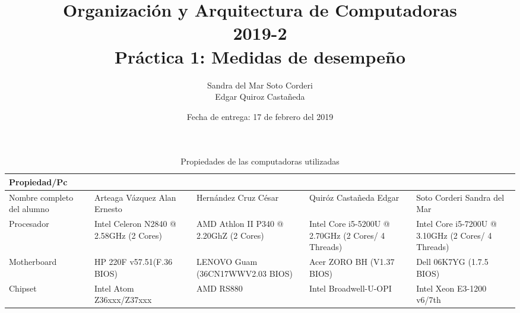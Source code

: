 \documentclass{article}
\begin{document}
    
    \title{Organización y Arquitectura de Computadoras\\
    \large 2019-2 \\
    \large Práctica 1: Medidas de desempeño}

    \date{Fecha de entrega: 17 de febrero del 2019}

    \author{Sandra del Mar Soto Corderi\\
    Edgar Quiroz Castañeda}

    \maketitle

    
\begin{table}
\caption*{Propiedades de las computadoras utilizadas}
\begin{tabularx}{\linewidth}{|L|L|L|L|L|}
\hline
Propiedad/Pc                                   &  &      &                 &  \\ \hline
{}Nombre completo del alumno             & Arteaga	Vázquez	Alan Ernesto        &         Hernández Cruz César          & Quiróz	Castañeda	Edgar                     & Soto Corderi Sandra del Mar       \\ \hline
{}Procesador             & Intel Celeron N2840 @ 2.58GHz (2 Cores)                & AMD Athlon II P340 @ 2.20GhZ (2 Cores)                      & Intel Core i5-5200U @ 2.70GHz (2 Cores/ 4 Threads)                     & Intel Core i5-7200U @ 3.10GHz (2 Cores/ 4 Threads)       \\ \hline
{}Motherboard            & HP 220F v57.51(F.36 BIOS)                              & LENOVO Guam (36CN17WWV2.03 BIOS)                            & Acer ZORO BH (V1.37 BIOS)                                              & Dell 06K7YG (1.7.5 BIOS)                                 \\ \hline
{}Chipset                & Intel Atom Z36xxx/Z37xxx                               & AMD RS880                                                   & Intel Broadwell-U-OPI                                                  & Intel Xeon E3-1200 v6/7th                                \\ \hline

\end{tabularx}
\end{table}
\end{document}
